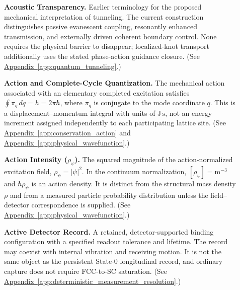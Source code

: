 \begin{description}
\item[] \begin{minipage}[t]{\linewidth}
\textbf{Acoustic Transparency.} Earlier terminology for the proposed mechanical interpretation of tunneling. The current construction distinguishes passive evanescent coupling, resonantly enhanced transmission, and externally driven coherent boundary control. None requires the physical barrier to disappear; localized-knot transport additionally uses the stated phase-action guidance closure.
(See \hyperref[app:quantum_tunneling]{Appendix~\ref*{app:quantum_tunneling}}.)
\end{minipage}

\item[] \begin{minipage}[t]{\linewidth}
\textbf{Action and Complete-Cycle Quantization.} The mechanical action associated with an elementary completed excitation satisfies $\oint\pi_q\,dq=h=2\pi\hbar$, where $\pi_q$ is conjugate to the mode coordinate $q$. This is a displacement--momentum integral with units of $\mathrm{J\,s}$, not an energy increment assigned independently to each participating lattice site.
(See \hyperref[app:conservation_action]{Appendix~\ref*{app:conservation_action}} and \hyperref[app:physical_wavefunction]{Appendix~\ref*{app:physical_wavefunction}}.)
\end{minipage}

\item[] \begin{minipage}[t]{\linewidth}
\textbf{Action Intensity ($\rho_\psi$).} The squared magnitude of the action-normalized excitation field, $\rho_\psi=|\psi|^2$. In the continuum normalization, $[\rho_\psi]=\mathrm{m^{-3}}$ and $\hbar\rho_\psi$ is an action density. It is distinct from the structural mass density $\rho$ and from a measured particle probability distribution unless the field--detector correspondence is supplied.
(See \hyperref[app:physical_wavefunction]{Appendix~\ref*{app:physical_wavefunction}}.)
\end{minipage}

\item[] \begin{minipage}[t]{\linewidth}
\textbf{Active Detector Record.} A retained, detector-supported binding configuration with a specified readout tolerance and lifetime. The record may coexist with internal vibration and receiving motion. It is not the same object as the persistent State-0 longitudinal record, and ordinary capture does not require FCC-to-SC saturation.
(See \hyperref[app:deterministic_measurement_resolution]{Appendix~\ref*{app:deterministic_measurement_resolution}}.)
\end{minipage}


\end{description}
